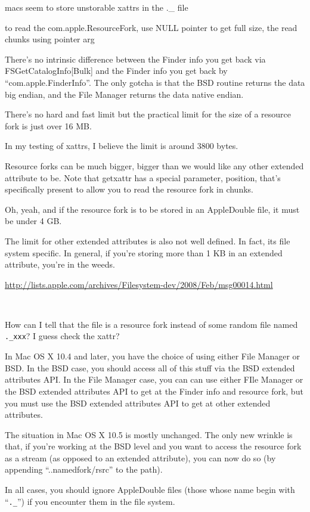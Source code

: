 \documentclass{book}
\begin{document}
macs seem to store unstorable xattrs in the .\_ file

to read the com.apple.ResourceFork, use NULL pointer to get full size, the read chunks using pointer arg

There's no intrinsic difference between the Finder info you get back via FSGetCatalogInfo[Bulk] and the Finder info you get back by ``com.apple.FinderInfo''. The only gotcha is that the BSD routine returns the data big endian, and the File Manager returns the data native endian.

There's no hard and fast limit but the practical limit for the size of a resource fork is just over 16 MB.

In my testing of xattrs, I believe the limit is around 3800 bytes.

Resource forks can be much bigger, bigger than we would like any other extended attribute to be. Note that getxattr has a special parameter, position, that's specifically present to allow you to read the resource fork in chunks.

Oh, yeah, and if the resource fork is to be stored in an AppleDouble file, it must be under 4 GB.

The limit for other extended attributes is also not well defined. In fact, its file system specific. In general, if you're storing more than 1 KB in an extended attribute, you're in the weeds.

\url{http://lists.apple.com/archives/Filesystem-dev/2008/Feb/msg00014.html}

~

How can I tell that the file is a resource fork instead of some random file named \verb+._xxx+?  I guess check the xattr?

In Mac OS X 10.4 and later, you have the choice of using either File Manager or BSD. In the BSD case, you should access all of this stuff via the BSD extended attributes API. In the File Manager case, you can can use either FIle Manager or the BSD extended attributes API to get at the Finder info and resource fork, but you must use the BSD extended attributes API to get at other extended attributes.

The situation in Mac OS X 10.5 is mostly unchanged. The only new wrinkle is that, if you're working at the BSD level and you want to access the resource fork as a stream (as opposed to an extended attribute), you can now do so (by appending ``..namedfork/rsrc'' to the path).

In all cases, you should ignore AppleDouble files (those whose name begin with ``\verb+._+'') if you encounter them in the file system.
\end{document}
